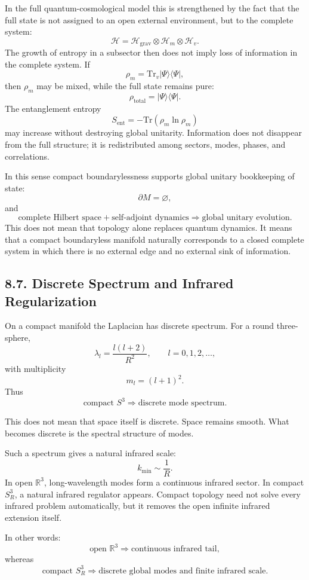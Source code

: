 \documentclass[12pt,a4paper]{article}
\theoremstyle{definition}
\begin{document}
In the full quantum-cosmological model this is strengthened by the fact that the full state is not assigned to an open external environment, but to the complete system:
\[
\mathcal H=\mathcal H_{\mathrm{grav}}\otimes\mathcal H_m\otimes\mathcal H_v.
\]
The growth of entropy in a subsector then does not imply loss of information in the complete system. If
\[
\rho_m=\mathrm{Tr}_v|\Psi\rangle\langle\Psi|,
\]
then \(\rho_m\) may be mixed, while the full state remains pure:
\[
\rho_{\mathrm{total}}=|\Psi\rangle\langle\Psi|.
\]
The entanglement entropy
\[
S_{\mathrm{ent}}=-\mathrm{Tr}(\rho_m\ln\rho_m)
\]
may increase without destroying global unitarity. Information does not disappear from the full structure; it is redistributed among sectors, modes, phases, and correlations.

In this sense compact boundarylessness supports global unitary bookkeeping of state:
\[
\partial M=\varnothing,
\]
and
\[
\text{complete Hilbert space}+\text{self-adjoint dynamics}
\Rightarrow
\text{global unitary evolution}.
\]
This does not mean that topology alone replaces quantum dynamics. It means that a compact boundaryless manifold naturally corresponds to a closed complete system in which there is no external edge and no external sink of information.

\subsection*{8.7. Discrete Spectrum and Infrared Regularization}

On a compact manifold the Laplacian has discrete spectrum. For a round three-sphere,
\[
\lambda_l=\frac{l(l+2)}{R^2},
\qquad
l=0,1,2,\ldots,
\]
with multiplicity
\[
m_l=(l+1)^2.
\]
Thus
\[
\text{compact }S^3\Rightarrow \text{discrete mode spectrum}.
\]

This does not mean that space itself is discrete. Space remains smooth. What becomes discrete is the spectral structure of modes.

Such a spectrum gives a natural infrared scale:
\[
k_{\min}\sim \frac{1}{R}.
\]
In open \(\mathbb R^3\), long-wavelength modes form a continuous infrared sector. In compact \(S^3_R\), a natural infrared regulator appears. Compact topology need not solve every infrared problem automatically, but it removes the open infinite infrared extension itself.

In other words:
\[
\text{open }\mathbb R^3\Rightarrow \text{continuous infrared tail},
\]
whereas
\[
\text{compact }S^3_R\Rightarrow \text{discrete global modes and finite infrared scale}.
\]
\end{document}
